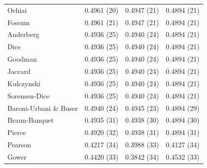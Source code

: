 \begin{table}[t]
{\begin{tabular}{lccc}
Ochiai & 0.4961 (20) & 0.4947 (21) & 0.4894 (21) \\
Fossum & 0.4961 (21) & 0.4947 (21) & 0.4894 (21) \\
Anderberg & 0.4936 (25) & 0.4940 (24) & 0.4894 (21) \\
Dice & 0.4936 (25) & 0.4940 (24) & 0.4894 (21) \\
Goodman & 0.4936 (25) & 0.4940 (24) & 0.4894 (21) \\
Jaccard & 0.4936 (25) & 0.4940 (24) & 0.4894 (21) \\
Kulczynski & 0.4936 (25) & 0.4940 (24) & 0.4894 (21) \\
Sorensen-Dice & 0.4936 (25) & 0.4940 (24) & 0.4894 (21) \\
Baroni-Urbani \& Buser & 0.4940 (24) & 0.4945 (23) & 0.4894 (29) \\
Braun-Banquet & 0.4935 (31) & 0.4938 (30) & 0.4894 (30) \\
Pierce & 0.4920 (32) & 0.4938 (31) & 0.4894 (31) \\
Pearson & 0.4217 (34) & 0.3988 (33) & 0.4127 (34) \\
Gower & 0.4420 (33) & 0.3842 (34) & 0.4532 (33) \\
\bottomrule
\end{tabular}
}
\end{table}
